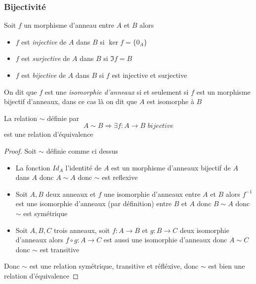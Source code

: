 \documentclass[11pt,colorlinks]{book}
\theoremstyle{mytheoremstyle}
\theoremstyle{mytheoremstyle}
\theoremstyle{mytheoremstyle}
\theoremstyle{mytheoremstyle}
\theoremstyle{mytheoremstyle}
\theoremstyle{mytheoremstyle}
\theoremstyle{mytheoremstyle}
\theoremstyle{mytheoremstyle}
\theoremstyle{myproblemstyle}
\begin{document}
\subsubsection{Bijectivité}
\begin{theorem}
  Soit $f$ un morphisme d'anneau entre $A$ et $B$ alors 
  \begin{itemize}
    \item $f$ est \textit{injective} de $A$ dans $B$ si $\ker f = \{0_A\}$
    \item $f$ est \textit{surjective} de $A$ dans $B$ si $\Im f = B$
    \item $f$ est \textit{bijective} de $A$ dans $B$ si $f$ est injective et surjective
  \end{itemize}
\end{theorem}
\begin{definition}
  On dit que $f$ est une \textit{isomorphie d'anneaux} si et seulement si $f$ est un morphisme bijectif d'anneaux, dans ce cas là on dit que 
  $A$ est isomorphe à $B$
\end{definition}
\begin{rmq}
  La relation $\sim$ définie par
  \begin{equation*}
    A \sim B \Rightarrow \exists f : A \to B \textit{ bijective} 
  \end{equation*}
  est une relation d'équivalence
  \begin{proof}
    Soit $\sim$ définie comme ci dessus
    \begin{itemize}
      \item La fonction $Id_{A}$ l'identité de $A$ est un morphisme d'anneaux bijectif de $A$ dans $A$ donc $A \sim A$ donc $\sim$ est reflexive
      \item Soit $A,B$ deux anneaux et $f$ une isomorphie d'anneaux entre $A$ et $B$ alors $f^{-1}$ est une isomorphie d'anneaux (par définition) entre $B$ et $A$ donc $B \sim A$
      donc $\sim$ est symétrique 
      \item Soit $A,B,C$ trois anneaux, soit $f : A \to B$ et $g : B \to C$ deux isomorphie d'anneaux alors $f \circ g : A \to C$ est aussi une isomorphie d'anneaux donc $A \sim C$ 
      donc $\sim$ est transitive
    \end{itemize}
    Donc $\sim$ est une relation symétrique, transitive et réfléxive, donc $\sim$ est bien une relation d'équivalence
  \end{proof}
\end{rmq}
\end{document}
